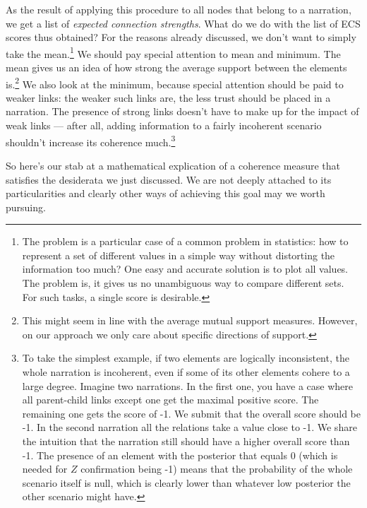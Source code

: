 \documentclass[10pt,]{scrartcl}
\newcommand{\s}[1]{\mbox{\textsf{#1}}}
\begin{document}
 As the result of applying this procedure to all  nodes that belong to a narration, we get a list of \textit{expected connection strengths}. What do we do with the list of \textsf{ECS} scores thus obtained? For
the reasons already discussed, we don't want to simply take the mean.\footnote{The problem is a particular case of a common problem in statistics: how
to represent a set of different values in a simple way without
distorting the information too much? One easy and accurate solution is
to plot all values. The problem is, it gives us no unambiguous way to
compare different sets. For such tasks, a single score is desirable.} We
should pay special attention to \s{mean}  and \s{minimum}. The
mean gives us an idea of how strong the average support between the
elements is.\footnote{This might seem  in line with the average mutual support
measures. However, on our approach we only care about specific directions of support.}  We also look at the minimum, because special attention should be paid to weaker links: the
weaker such links are, the less trust should be placed in a narration.
The presence of strong links doesn't have to make up for the impact of weak
links --- after all, adding information to a fairly incoherent scenario shouldn't increase its coherence much.\footnote{To
take the simplest example, if two elements are logically inconsistent, the whole narration is incoherent, even if some of its other elements cohere to a large degree. Imagine two narrations. In the first one, you have a case where all
parent-child links except one get the maximal positive score. The
remaining one gets the score of -1. We submit that the overall score
should be -1. In the second narration all the relations take a value
close to -1. We share the intuition that the narration still should have
a higher overall score than -1. The presence of an element with the
posterior that equals 0 (which is needed for \(Z\) confirmation being
-1) means that the probability of the whole scenario itself is null, which is clearly lower than whatever low posterior the other scenario might have.}






So here's our stab at a mathematical explication of a coherence measure
that satisfies the desiderata we just discussed. We are not deeply
attached to its particularities and clearly other ways of achieving this
goal may we worth pursuing.
\end{document}
